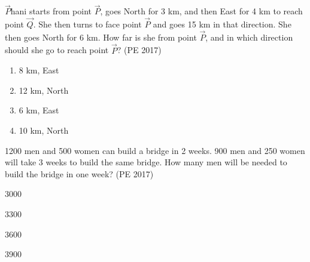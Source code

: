 \item $\vec{P}$hani starts from point $\vec{P}$, goes North for 3 km, and then East for 4 km to reach point $\vec{Q}$. She then turns to face point $\vec{P}$ and goes 15 km in that direction. She then goes North for 6 km. How far is she from point $\vec{P}$, and in which direction should she go to reach point $\vec{P}$?
\hfill{(PE 2017)}
\begin{enumerate}
\item 8 km, East
\item 12 km, North
\item 6 km, East
\item 10 km, North
\end{enumerate}

\item 1200 men and 500 women can build a bridge in 2 weeks. 900 men and 250 women will take 3 weeks to build the same bridge. How many men will be needed to build the bridge in one week?
\hfill{(PE 2017)}
\begin{enumerate}
\begin{multicols}{4}
\item 3000
\item 3300
\item 3600
\item 3900
\end{multicols}
\end{enumerate}

